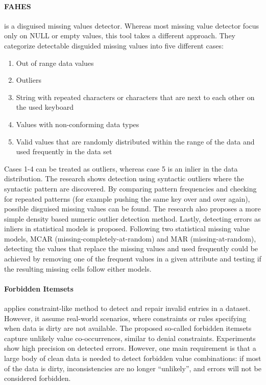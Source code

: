 \paragraph{FAHES \cite{Qahtan2018-te}} is a disguised missing values detector. Whereas most missing value detector focus only on NULL or empty values, this tool takes a different approach. They categorize detectable disguided missing values into five different cases: 
\begin{enumerate}
    \item Out of range data values
    \item Outliers
    \item String with repeated characters or characters that are next to each other on the used keyboard
    \item Values with non-conforming data types
    \item Valid values that are randomly distributed within the range of the data and used frequently in the data set
\end{enumerate}

Cases 1-4 can be treated as outliers, whereas case 5 is an inlier in the data distribution. 
The research shows detection using syntactic outliers where the syntactic pattern are discovered. By comparing pattern frequencies and checking for repeated patterns (for example pushing the same key over and over again), possible disguised missing values can be found. The research also proposes a more simple density based numeric outlier detection method. Lastly, detecting errors as inliers in statistical models is proposed. Following two statistical missing value models, MCAR (missing-completely-at-random) and MAR (missing-at-random), detecting the values that replace the missing values and used frequently could be achieved by removing one of the frequent values in a given attribute and testing if the resulting missing cells follow either models.

\paragraph{Forbidden Itemsets \cite{Rammelaere2019-ea}} applies constraint-like method to detect and repair invalid entries in a dataset. However, it assume real-world scenarios, where constraints or rules specifying when data is dirty are not available. The proposed so-called forbidden itemsets capture unlikely value co-occurrences, similar to denial constraints. Experiments show high precision on detected errors. However, one main requirement is that a large body of clean data is needed to detect forbidden value combinations: if most of the data is dirty, inconsistencies are no longer “unlikely”, and errors will not be considered forbidden. 

